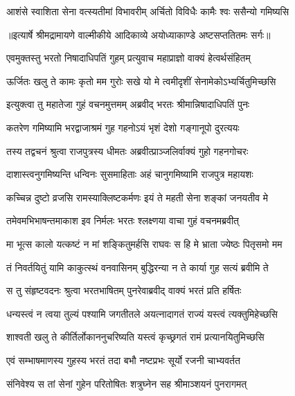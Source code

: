 \twolineshloka
{आशंसे स्वाशिता सेना वत्स्यतीमां विभावरीम्}
{अर्चितो विविधैः कामैः श्वः ससैन्यो गमिष्यसि} %


{॥इत्यार्षे श्रीमद्रामायणे वाल्मीकीये आदिकाव्ये अयोध्याकाण्डे अष्टसप्ततितमः सर्गः॥}


\twolineshloka
{एवमुक्तस्तु भरतो निषादाधिपतिं गुहम्}
{प्रत्युवाच महाप्राज्ञो वाक्यं हेत्वर्थसंहितम्} %

\twolineshloka
{ऊर्जितः खलु ते कामः कृतो मम गुरोः सखे}
{यो मे त्वमीदृशीं सेनामेकोऽभ्यर्चितुमिच्छसि} %

\twolineshloka
{इत्युक्त्वा तु महातेजा गुहं वचनमुत्तमम्}
{अब्रवीद् भरतः श्रीमान्निषादाधिपतिं पुनः} %

\twolineshloka
{कतरेण गमिष्यामि भरद्वाजाश्रमं गुह}
{गहनोऽयं भृशं देशो गङ्गानूपो दुरत्ययः} %

\twolineshloka
{तस्य तद्वचनं श्रुत्वा राजपुत्रस्य धीमतः}
{अब्रवीत्प्राञ्जलिर्वाक्यं गुहो गहनगोचरः} %

\twolineshloka
{दाशास्त्वनुगमिष्यन्ति धन्विनः सुसमाहिताः}
{अहं चानुगमिष्यामि राजपुत्र महायशः} %

\twolineshloka
{कच्चिन्न दुष्टो व्रजसि रामस्याक्लिष्टकर्मणः}
{इयं ते महती सेना शङ्कां जनयतीव मे} %

\twolineshloka
{तमेवमभिभाषन्तमाकाश इव निर्मलः}
{भरतः श्लक्ष्णया वाचा गुहं वचनमब्रवीत्} %

\twolineshloka
{मा भूत्स कालो यत्कष्टं न मां शङ्कितुमर्हसि}
{राघवः स हि मे भ्राता ज्येष्ठः पितृसमो मम} %

\twolineshloka
{तं निवर्तयितुं यामि काकुत्स्थं वनवासिनम्}
{बुद्धिरन्या न ते कार्या गुह सत्यं ब्रवीमि ते} %

\twolineshloka
{स तु संहृष्टवदनः श्रुत्वा भरतभाषितम्}
{पुनरेवाब्रवीद् वाक्यं भरतं प्रति हर्षितः} %

\twolineshloka
{धन्यस्त्वं न त्वया तुल्यं पश्यामि जगतीतले}
{अयत्नादागतं राज्यं यस्त्वं त्यक्तुमिहेच्छसि} %

\twolineshloka
{शाश्वती खलु ते कीर्तिर्लोकाननुचरिष्यति}
{यस्त्वं कृच्छ्रगतं रामं प्रत्यानयितुमिच्छसि} %

\twolineshloka
{एवं सम्भाषमाणस्य गुहस्य भरतं तदा}
{बभौ नष्टप्रभः सूर्यो रजनी चाभ्यवर्तत} %

\twolineshloka
{संनिवेश्य स तां सेनां गुहेन परितोषितः}
{शत्रुघ्नेन सह श्रीमाञ्शयनं पुनरागमत्} %

